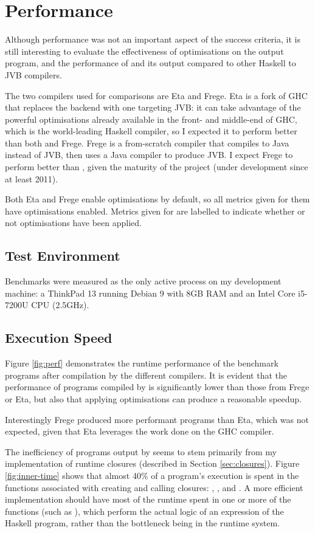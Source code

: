 \documentclass[dissertation.tex]{subfiles}
\begin{document}
\section{Performance}
{
    Although performance was not an important aspect of the success criteria, it is still interesting to evaluate the effectiveness of optimisations on the output program, and the performance of \compilername and its output compared to other Haskell to JVB compilers.

    The two compilers used for comparisons are Eta and Frege. Eta is a fork of GHC that replaces the backend with one targeting JVB: it can take advantage of the powerful optimisations already available in the front- and middle-end of GHC, which is the world-leading Haskell compiler, so I expected it to perform better than both \compilername and Frege. Frege is a from-scratch compiler that compiles to Java instead of JVB, then uses a Java compiler to produce JVB. I expect Frege to perform better than \compilername, given the maturity of the project (under development since at least 2011).

    Both Eta and Frege enable optimisations by default, so all metrics given for them have optimisations enabled. Metrics given for \compilername are labelled to indicate whether or not optimisations have been applied.

    \subsection{Test Environment}\label{sec:test-environment}
    {
        Benchmarks were measured as the only active process on my development machine: a ThinkPad 13 running Debian 9 with 8GB RAM and an Intel Core i5-7200U CPU (2.5GHz).
    }
    \subsection{Execution Speed}
    {
        Figure \ref{fig:perf} demonstrates the runtime performance of the benchmark programs after compilation by the different compilers. It is evident that the performance of programs compiled by \compilername is significantly lower than those from Frege or Eta, but also that applying optimisations can produce a reasonable speedup.

        Interestingly Frege produced more performant programs than Eta, which was not expected, given that Eta leverages the work done on the GHC compiler.

        The inefficiency of programs output by \compilername seems to stem primarily from my implementation of runtime closures (described in Section \ref{sec:closures}). Figure \ref{fig:inner-time} shows that almost 40\% of a program's execution is spent in the functions associated with creating and calling closures: , , and . A more efficient implementation should have most of the runtime spent in one or more of the  functions (such as ), which perform the actual logic of an expression of the Haskell program, rather than the bottleneck being in the runtime system.

}}
\end{document}

